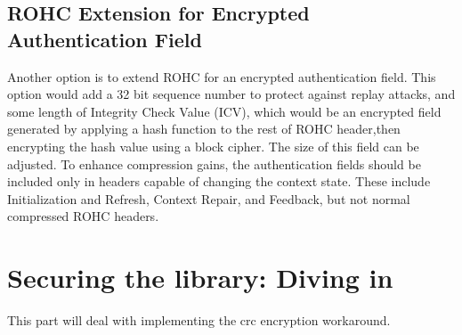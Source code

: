 \documentclass[a4paper,11pt]{article}
\begin{document}
\subsection{ROHC Extension for Encrypted Authentication Field}
Another option is to extend ROHC for an encrypted authentication
field. This option would add a 32 bit sequence number to protect against replay attacks, and some length of Integrity Check Value (ICV), which would be an encrypted field generated by applying a hash function to the rest of ROHC header,then encrypting the hash value using a block cipher. The size of this field can be adjusted. To enhance compression gains, the authentication fields should be included only in headers capable of changing the context state. These include Initialization and Refresh, Context Repair, and Feedback, but not normal compressed ROHC headers.


\pagebreak
\section{Securing the library: Diving in}
This part will deal with implementing the crc encryption workaround.
\end{document}
